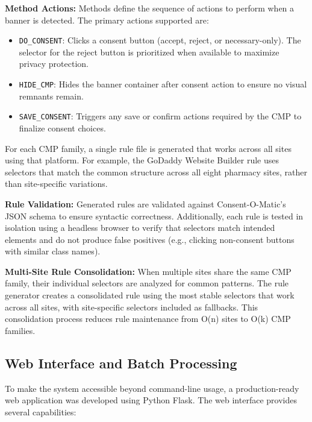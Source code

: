 \documentclass[conference]{IEEEtran}
\begin{document}
\textbf{Method Actions:} Methods define the sequence of actions to perform when a banner is detected. The primary actions supported are:

\begin{itemize}

    \item \texttt{DO\_CONSENT}: Clicks a consent button (accept, reject, or necessary-only). The selector for the reject button is prioritized when available to maximize privacy protection.

    

    \item \texttt{HIDE\_CMP}: Hides the banner container after consent action to ensure no visual remnants remain.

    

    \item \texttt{SAVE\_CONSENT}: Triggers any save or confirm actions required by the CMP to finalize consent choices.

\end{itemize}

For each CMP family, a single rule file is generated that works across all sites using that platform. For example, the GoDaddy Website Builder rule uses selectors that match the common structure across all eight pharmacy sites, rather than site-specific variations.

\textbf{Rule Validation:} Generated rules are validated against Consent-O-Matic's JSON schema to ensure syntactic correctness. Additionally, each rule is tested in isolation using a headless browser to verify that selectors match intended elements and do not produce false positives (e.g., clicking non-consent buttons with similar class names).

\textbf{Multi-Site Rule Consolidation:} When multiple sites share the same CMP family, their individual selectors are analyzed for common patterns. The rule generator creates a consolidated rule using the most stable selectors that work across all sites, with site-specific selectors included as fallbacks. This consolidation process reduces rule maintenance from O(n) sites to O(k) CMP families.

\subsection{Web Interface and Batch Processing}

To make the system accessible beyond command-line usage, a production-ready web application was developed using Python Flask. The web interface provides several capabilities:
\end{document}
